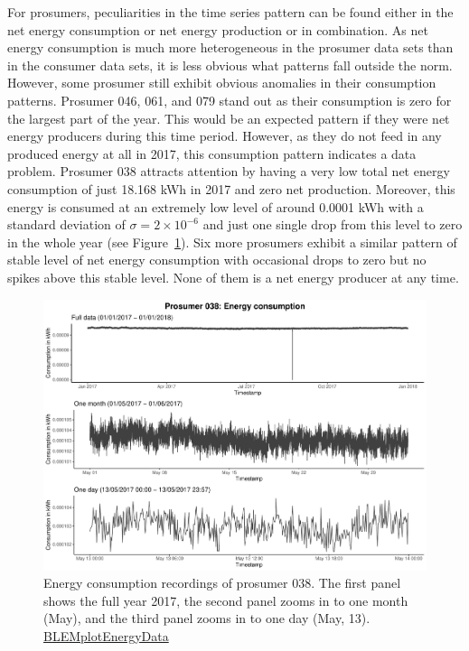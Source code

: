 For prosumers, peculiarities in the time series pattern can be found either in the net energy consumption or net energy production or in combination. As net energy consumption is much more heterogeneous in the prosumer data sets than in the consumer data sets, it is less obvious what patterns fall outside the norm. However, some prosumer still exhibit obvious anomalies in their consumption patterns. Prosumer 046, 061, and 079 stand out as their consumption is zero for the largest part of the year. This would be an expected pattern if they were net energy producers during this time period. However, as they do not feed in any produced energy at all in 2017, this consumption pattern indicates a data problem. 
Prosumer 038 attracts attention by having a very low total net energy consumption of just 18.168 kWh in 2017 and zero net production. Moreover, this energy is consumed at an extremely low level of around 0.0001 kWh with a standard deviation of $\sigma=2\times10^{-6}$ and just one single drop from this level to zero in the whole year (see Figure~\ref{Fig:energycons_p038}). Six more prosumers exhibit a similar pattern of stable level of net energy consumption with occasional drops to zero but no spikes above this stable level. None of them is a net energy producer at any time.

\begin{figure}[htbp]
 \centering
\includegraphics[width=\textwidth]{thesis/graphs/timeseries/p038_cons.pdf}
\caption[Energy consumption recordings of prosumer 038]{Energy consumption recordings of prosumer 038. The first panel shows the full year 2017, the second panel zooms in to one month (May), and the third panel zooms in to one day (May, 13). \quantnet\href{ }{BLEMplotEnergyData}}
\label{Fig:energycons_p038}
\end{figure}

